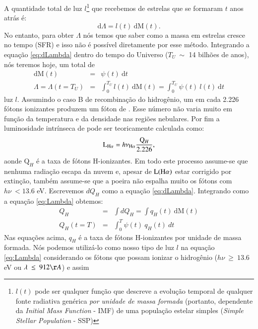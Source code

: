 A quantidade total de luz $l$\footnote{$l(t)$ pode ser qualquer função que descreve a evolução
temporal de qualquer fonte radiativa genérica \emph{por unidade de massa formada} (portanto,
dependente da {\em Initial Mass Function} - IMF) de uma população estelar simples ({\em Simple
Stellar Population} - SSP)} que recebemos de estrelas que se formaram $t$ anos atrás é:
\begin{equation}
	\mathrm{d}\Lambda = l(t)\ \mathrm{d}\mathrm{M}(t).
	\label{eq:dLambda}
\end{equation}
\noindent No entanto, para obter $\Lambda$ nós temos que saber como a massa em estrelas cresce no
tempo (SFR) e isso não é possível diretamente por esse método. Integrando a equação
\eqref{eq:dLambda} dentro do tempo do Universo ($T_U\ \sim$ 14 bilhões de anos), nós teremos hoje,
um total de
\begin{eqnarray}
	\mathrm{d}\mathrm{M}(t) &=& \psi(t)\ \mathrm{d}t \\
	\Lambda = \Lambda(t = T_U) &=& \int_0^{T_U} l(t)\ \textrm{d}\textrm{M}(t) = \int_0^{T_U} \psi(t)\
	l(t)\ \textrm{d}t
	\label{eq:Lambda}
\end{eqnarray}
\noindent luz $l$. Assumindo o caso B de recombinação do hidrogênio, um em cada 2.226 fótons
ionizantes produzem um fóton de \Halpha \citep{Osterbrock.Ferland.2006a}. Esse número não varia
muito em função da temperatura e da densidade nas regiões nebulares. Por fim a luminosidade
intrínseca de \Halpha pode ser teoricamente calculada como:
\begin{equation}
	\LHalpha = h \nu_{\Halpha} \frac{\mathrm{Q}_H}{2.226},
	\label{eq:LHa_recomb_theory}
\end{equation}
\noindent aonde $\mathrm{Q}_H$ é a taxa de fótons H-ionizantes. Em todo este processo
assume-se que nenhuma radiação escapa da nuvem e, apesar de $\mathrm{L}(\Halpha)$ estar corrigido
por extinção, também assume-se que a poeira não espalha muito os fótons com $h\nu\ < 13.6$ eV.
Escrevemos $dQ_H$ como a equação \eqref{eq:dLambda}. Integrando como a equação \eqref{eq:Lambda}
obtemos:
\begin{eqnarray}
	Q_H &=& \int dQ_H = \int q_H(t)\ \mathrm{d}\mathrm{M}(t) \\ 
	Q_H(t = T) &=& \int_0^T \psi(t)\ q_H(t)\ dt
	\label{eq:QH}
\end{eqnarray}
\noindent Nas equações acima, $q_H$ é a taxa de fótons H-ionizantes por unidade de massa formada.
Nós podemos utilizá-lo como nosso tipo de luz $l$ na equação \eqref{eq:Lambda} considerando os
fótons que possam ionizar o hidrogênio ($h\nu\ \geq\ 13.6$ eV ou $\lambda\ \leq\ 912\AA$) e assim
